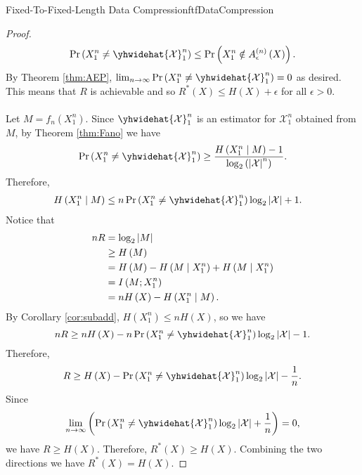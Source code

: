 \documentclass[math, code]{amznotes}
\theoremstyle{remark}
\begin{document}
\begin{thmbox}{Fixed-To-Fixed-Length Data Compression}{ftfDataCompression}
\begin{proof}
\begin{equation*}
            \Pr\left(X_1^n \neq \yhwidehat{\mathcal{X}}_1^n\right) \leq \Pr\left(X_1^n \notin A_{\epsilon}^{\left(n\right)}\left(X\right)\right).
        \end{equation*}
        By Theorem \ref{thm:AEP}, $\lim_{n \to \infty}\Pr\left(X_1^n \neq \yhwidehat{\mathcal{X}}_1^n\right) = 0$ as desired. This means that $R$ is achievable and so $R^*\left(X\right) \leq H\left(X\right) + \epsilon$ for all $\epsilon > 0$.
        \\\\
        Let $M = f_n\left(X_1^n\right)$. Since $\yhwidehat{\mathcal{X}}_1^n$ is an estimator for $\mathcal{X}_1^n$ obtained from $M$, by Theorem \ref{thm:Fano} we have 
        \begin{equation*}
            \Pr\left(X_1^n \neq \yhwidehat{\mathcal{X}}_1^n\right) \geq \frac{H\left(X_1^n \mid M\right) - 1}{\log_2\left(\abs{\mathcal{X}}^n\right)}.
        \end{equation*}
        Therefore,
        \begin{align*}
            H\left(X_1^n \mid M\right) & \leq n\Pr\left(X_1^n \neq \yhwidehat{\mathcal{X}}_1^n\right)\log_2\abs{\mathcal{X}} + 1.
        \end{align*}
        Notice that 
        \begin{align*}
            nR & = \log_2{\left\lvert {M} \right\rvert} \\
            & \geq H\left(M\right) \\
            & = H\left(M\right) - H\left(M \mid X_1^n\right) + H\left(M \mid X_1^n\right) \\
            & = I\left(M ; X_1^n\right) \\
            & = nH\left(X\right) - H\left(X_1^n \mid M\right).
        \end{align*}
        By Corollary \ref{cor:subadd}, $H\left(X_1^n\right) \leq nH\left(X\right)$, so we have 
        \begin{equation*}
            nR \geq nH\left(X\right) - n\Pr\left(X_1^n \neq \yhwidehat{\mathcal{X}}_1^n\right)\log_2\abs{\mathcal{X}} - 1.
        \end{equation*}
        Therefore, 
        \begin{equation*}
            R \geq H\left(X\right) - \Pr\left(X_1^n \neq \yhwidehat{\mathcal{X}}_1^n\right)\log_2\abs{\mathcal{X}} - \frac{1}{n}.
        \end{equation*}
        Since 
        \begin{equation*}
            \lim_{n \to \infty}\left(\Pr\left(X_1^n \neq \yhwidehat{\mathcal{X}}_1^n\right)\log_2\abs{\mathcal{X}} + \frac{1}{n}\right) = 0,
        \end{equation*}
        we have $R \geq H\left(X\right)$. Therefore, $R^*\left(X\right) \geq H\left(X\right)$. Combining the two directions we have $R^*\left(X\right) = H\left(X\right)$.
    \end{proof}
\end{thmbox}
\end{document}
